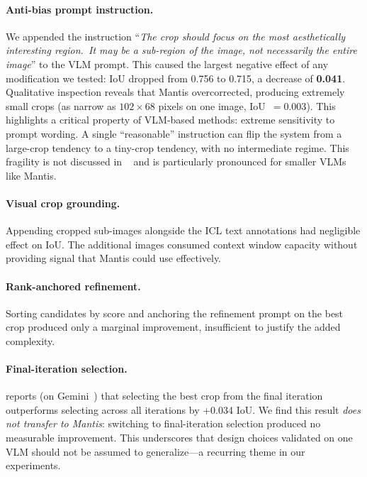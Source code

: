 \paragraph{Anti-bias prompt instruction.}
We appended the instruction ``\emph{The crop should focus on the most
aesthetically interesting region.\ It may be a sub-region of the image,
not necessarily the entire image}'' to the VLM prompt.  This caused the
largest negative effect of any modification we tested: IoU dropped from
0.756 to 0.715, a decrease of \textbf{0.041}.  Qualitative inspection
reveals that Mantis overcorrected, producing extremely small crops (as
narrow as $102 \times 68$ pixels on one image, IoU~$= 0.003$).  This
highlights a critical property of VLM-based methods: extreme
sensitivity to prompt wording.  A single ``reasonable'' instruction can
flip the system from a large-crop tendency to a tiny-crop tendency,
with no intermediate regime.  This fragility is not discussed in
\baseline~\cite{cropper2025} and is particularly pronounced for
smaller VLMs like Mantis.

\paragraph{Visual crop grounding.}
Appending cropped sub-images alongside the ICL text annotations had
negligible effect on IoU.  The additional images consumed context window
capacity without providing signal that Mantis could use effectively.

\paragraph{Rank-anchored refinement.}
Sorting candidates by score and anchoring the refinement prompt on the
best crop produced only a marginal improvement, insufficient to justify
the added complexity.

\paragraph{Final-iteration selection.}
\baseline reports (on Gemini~\cite{gemini2024}) that selecting the best
crop from the final iteration outperforms selecting across all
iterations by +0.034 IoU.  We find this result \emph{does not transfer
to Mantis}: switching to final-iteration selection produced no
measurable improvement.  This underscores that design choices validated
on one VLM should not be assumed to generalize---a recurring theme in
our experiments.

